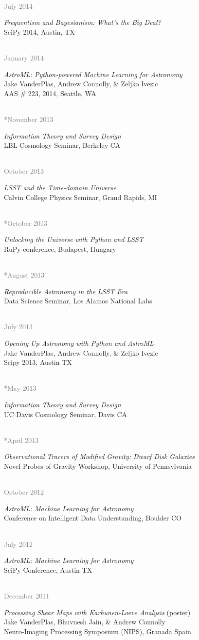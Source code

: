 \documentclass{article} %
\newlength\sidebarwidth
\newcommand{\dateonly}[2][]
	 {\begin{minipage}{\textwidth}
	 \vspace*{.4\baselineskip}
         \nopagebreak\hspace{0in}%
         \nopagebreak\begin{minipage}[t]{\sidebarwidth - .2cm}
         \raggedleft {~}
         {\\[-\baselineskip] \textcolor{gray}{\footnotesize #1}}
	 \end{minipage}%
	 \hfill
	 \begin{minipage}[t]{\linewidth - \sidebarwidth}
	 #2%
	 \end{minipage}%
	 \vspace*{.2\baselineskip plus 1\baselineskip minus
	 .2\baselineskip}%
	 \end{minipage}}
\begin{document}
  \dateonly[July 2014]{
    {\it Frequentism and Bayesianism: What's the Big Deal?}\\
    SciPy 2014, Austin, TX
  }

  \dateonly[January 2014]{
    {\it AstroML: Python-powered Machine Learning for Astronomy}\\
    Jake VanderPlas, Andrew Connolly, \& Zeljko Ivezic\\
    AAS \# 223, 2014, Seattle, WA
  }

  \dateonly[**November 2013]{
    {\it Information Theory and Survey Design}\\
    LBL Cosmology Seminar, Berkeley CA
  }

  \dateonly[October 2013]{
    {\it LSST and the Time-domain Universe}\\
    Calvin College Physics Seminar, Grand Rapids, MI
  }

  \dateonly[**October 2013]{
    {\it Unlocking the Universe with Python and LSST}\\
    RuPy conference, Budapest, Hungary
  }

  \dateonly[**August 2013]{
    {\it Reproducible Astronomy in the LSST Era}\\
    Data Science Seminar, Los Alamos National Labs
  }

  \dateonly[July 2013]{
    {\it Opening Up Astronomy with Python and AstroML}\\
    Jake VanderPlas, Andrew Connolly, \& Zeljko Ivezic\\
    Scipy 2013, Austin TX
  }

  \dateonly[**May 2013]{
    {\it Information Theory and Survey Design}\\
    UC Davis Cosmology Seminar, Davis CA
  }

  \dateonly[**April 2013]{
    {\it Observational Tracers of Modified Gravity: Dwarf Disk Galaxies}\\
    Novel Probes of Gravity Workshop, University of Pennsylvania
  }

  \dateonly[October 2012]{
    {\it AstroML: Machine Learning for Astronomy}\\
    Conference on Intelligent Data Understanding, Boulder CO
  }

  \dateonly[July 2012]{
    {\it AstroML: Machine Learning for Astronomy}\\
    SciPy Conference, Austin TX
  }
    
  \dateonly[December 2011]{
    {\it Processing Shear Maps with Karhunen-Loeve Analysis} (poster)\\
    Jake VanderPlas, Bhuvnesh Jain, \& Andrew Connolly\\
    Neuro-Imaging Processing Symposium (NIPS), Granada Spain
  }
    
\end{document}
